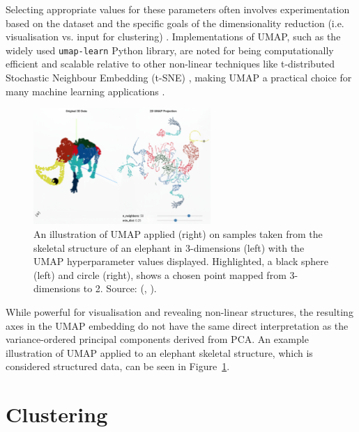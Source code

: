 \documentclass[10pt,oneside]{report}
\renewcommand{\citet}[1]{\citeauthor{#1}, \citeyear{#1}}
\begin{document}
Selecting appropriate values for these parameters often involves experimentation based on the dataset and the specific goals of the dimensionality reduction (i.e. visualisation vs. input for clustering) \cite{mcinnes2018umap}. Implementations of UMAP, such as the widely used \texttt{umap-learn} Python library, are noted for being computationally efficient and scalable relative to other non-linear techniques like t-distributed Stochastic Neighbour Embedding (t-SNE) \cite{cai2022theoretical}, making UMAP a practical choice for many machine learning applications \cite{mcinnes2018umap}.

\begin{figure}[htbp]
    \centering
    \includegraphics[width=0.6\textwidth]{./images/umapElephant.png}
    \caption{An illustration of UMAP applied (right) on samples taken from the skeletal structure of an elephant in 3-dimensions (left) with the UMAP hyperparameter values displayed. Highlighted, a black sphere (left) and circle (right), shows a chosen point mapped from 3-dimensions to 2. Source: (\citet{umapelephant}).}\label{fig:umapElephant}
\end{figure}

While powerful for visualisation and revealing non-linear structures, the resulting axes in the UMAP embedding do not have the same direct interpretation as the variance-ordered principal components derived from PCA.
An example illustration of UMAP applied to an elephant skeletal structure, which is considered structured data, can be seen in Figure~\ref{fig:umapElephant}.


\section{Clustering}\label{sec:clustering}
\end{document}
